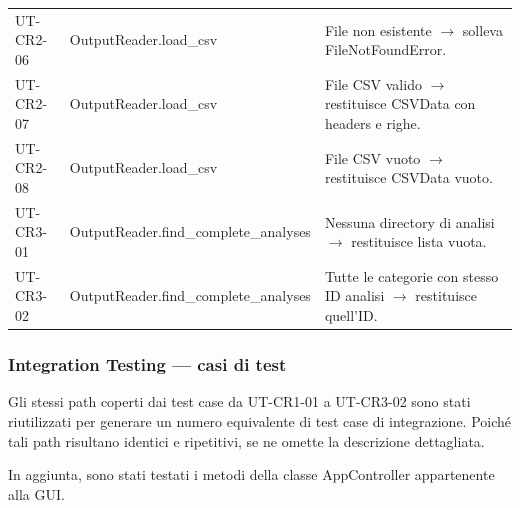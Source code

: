 \documentclass[11pt,a4paper]{article}
\makeatletter
\newif\ifmark@prevlower
\def\mark@casebreak#1{%
  \ifcat\noexpand#1\relax
    \mark@prevlowerfalse
  \else
    \ifnum`#1=\uccode`#1\relax
      \ifmark@prevlower\allowbreak\fi
      \mark@prevlowerfalse
    \else
      \ifnum`#1=\lccode`#1\relax
        \mark@prevlowertrue
      \else
        \mark@prevlowerfalse
      \fi
    \fi
  \fi}
\def\mark@brk#1{%
  \ifx#1\mark@stop
    \let\mark@next\relax
  \else
    \mark@casebreak{#1}%
    #1%
    \ifx#1.\allowbreak\else
      \ifx#1\_\allowbreak\else
        \ifx#1/\allowbreak\else
          \ifx#1(\allowbreak\fi
        \fi
      \fi
    \fi
    \let\mark@next\mark@brk
  \fi
  \mark@next}
\def\mark@stop{\mark@stop}
\DeclareRobustCommand{\mark@code}[1]{%
  \ifmmode
    \text{\ttfamily\small\mark@prevlowerfalse\mark@brk#1\mark@stop}%
  \else
    {\ttfamily\small\mark@prevlowerfalse\mark@brk#1\mark@stop}%
  \fi}
\DeclareRobustCommand{\code}[1]{\mark@code{#1}}
\DeclareRobustCommand{\cls}[1]{\mark@code{#1}}
\DeclareRobustCommand{\meth}[1]{\mark@code{#1}}
\def\mark@code#1{#1}%
\def\code#1{#1}%
\def\cls#1{#1}%
\def\meth#1{#1}%
\makeatother
\begin{document}
\begin{longtable}{@{}L{2.5cm} L{5.2cm} L{7.2cm}@{}}
  UT-CR2-06 & \meth{OutputReader.load\_csv} &
    File non esistente $\rightarrow$ solleva \code{FileNotFoundError}.\\
  UT-CR2-07 & \meth{OutputReader.load\_csv} &
    File CSV valido $\rightarrow$ restituisce \cls{CSVData} con headers e righe.\\
  UT-CR2-08 & \meth{OutputReader.load\_csv} &
    File CSV vuoto $\rightarrow$ restituisce \cls{CSVData} vuoto.\\
  UT-CR3-01 & \meth{OutputReader.find\_complete\_analyses} &
    Nessuna directory di analisi $\rightarrow$ restituisce lista vuota.\\
  UT-CR3-02 & \meth{OutputReader.find\_complete\_analyses} &
    Tutte le categorie con stesso ID analisi $\rightarrow$ restituisce quell'ID.\\
\end{longtable}

\subsubsection{Integration Testing --- casi di test}
\label{sec:it}

Gli stessi path coperti dai test case da UT-CR1-01 a UT-CR3-02 sono stati
riutilizzati per generare un numero equivalente di test case di integrazione.
Poich\'e tali path risultano identici e ripetitivi, se ne omette la descrizione
dettagliata.

In aggiunta, sono stati testati i metodi della classe \cls{AppController}
appartenente alla GUI.
\end{document}
